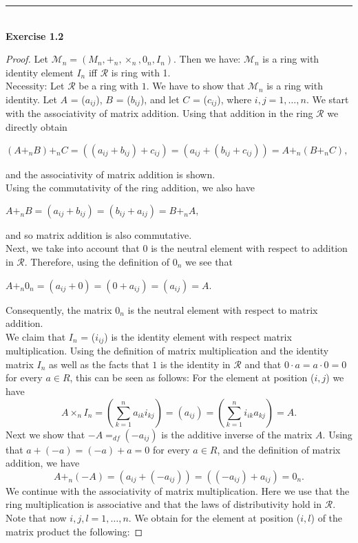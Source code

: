 \documentclass[a4paper]{article}
\begin{document}
\noindent\rule{12cm}{0.4pt}\\
\noindent \textbf{Exercise 1.2} 
\begin{proof}
Let $\mathcal{M}_{n} = (M_{n}, +_{n}, \times_{n}, 0_{n}, I_{n})$. Then we have: $\mathcal{M}_{n}$ is a ring with identity element $I_{n}$ iff $\mathcal{R}$ is ring with 1.\\
Necessity: Let $\mathcal{R}$ be a ring with $1$. We have to show that $\mathcal{M}_{n}$ is a ring with identity. Let $A$ = ($a_{ij}$), $B$ = ($b_{ij}$), and let $C$ = ($c_{ij}$), where $i,j = 1, \ldots, n$. We start with the associativity of matrix addition. Using that addition in the ring $\mathcal{R}$ we directly obtain
\begin{center}
$(A +_{n} B) +_{n} C = ((a_{ij} + b_{ij}) + c_{ij}) = (a_{ij} + (b_{ij} + c_{ij})) = A +_{n} (B +_{n} C),$
\end{center}
and the associativity of matrix addition is shown.\\
Using the commutativity of the ring addition, we also have
\begin{center}
$A +_{n} B = (a_{ij} + b_{ij}) = (b_{ij} + a_{ij}) = B +_{n} A,$
\end{center}
and so matrix addition is also commutative.\\
Next, we take into account that $0$ is the neutral element with respect to addition in $\mathcal{R}$. Therefore, using the definition of $0_{n}$ we see that
\begin{center}
$A +_{n} 0_{n} = (a_{ij} + 0) = (0 + a_{ij}) = (a_{ij}) = A$.
\end{center}
Consequently, the matrix $0_{n}$ is the neutral element with respect to matrix addition.\\
We claim that $I_{n}$ = ($i_{ij}$) is the identity element with respect matrix multiplication. Using the definition of matrix multiplication and the identity matrix $I_{n}$ as well as the facts that $1$ is the identity in $\mathcal{R}$ and that $0 \cdot a = a \cdot 0 = 0$ for every $a \in R$, this can be seen as follows: For the element at position ($i, j$) we have
$$A \times_{n} I_{n} = \left( \sum_{k=1}^{n}{a_{ik}i_{kj}}\right) = (a_{ij}) = \left( \sum_{k=1}^{n}{i_{ik}a_{kj}}\right) = A.$$
Next we show that $-A =_{df} (-a_{ij})$ is the additive inverse of the matrix $A$. Using that $a + (-a) = (-a) +a = 0$ for every $a \in R$, and the definition of matrix addition, we have
$$A +_{n} (-A) = (a_{ij} + (-a_{ij})) = ((-a_{ij}) + a_{ij}) = 0_{n} .$$
We continue with the associativity of matrix multiplication. Here we use that the ring multiplication is associative and that the laws of distributivity hold in $\mathcal{R}$. Note that now $i, j, l = 1, \ldots , n$. We obtain for the element at position ($i, l$) of the matrix product the following:

\end{proof}
\end{document}
